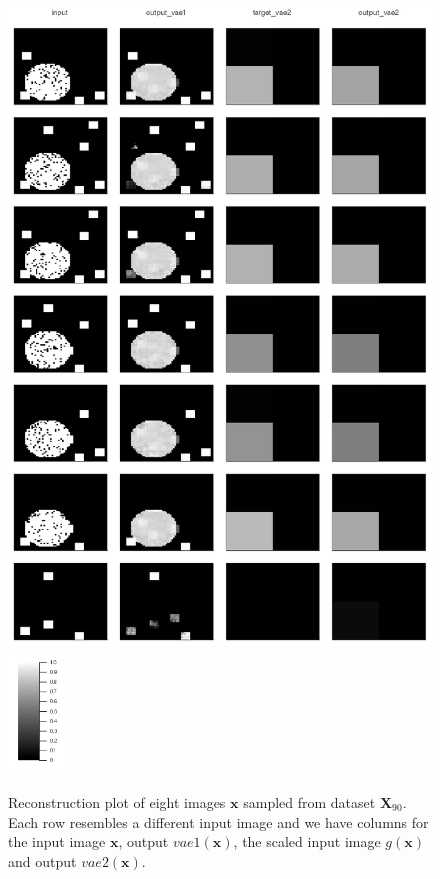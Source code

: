 \documentclass[12pt]{report}
\theoremstyle{definition}
\begin{document}
\begin{figure}
\begin{center}
  \includegraphics[width=11.5cm]{../code/plots/reconstruction1.png} 		  \includegraphics[width=1.5cm]{../code/plots/scale.png}
  \caption{Reconstruction plot of eight images $\mathbf{x}$ sampled from dataset $\mathbf{X}_{90}$. Each row resembles a different input image and we have columns for the input image $\mathbf{x}$, output $vae1(\mathbf{x})$, the scaled input image $g(\mathbf{x})$ and output $vae2(\mathbf{x})$.}
  \label{fig:recon1}
\end{center}
\end{figure}
\end{document}

